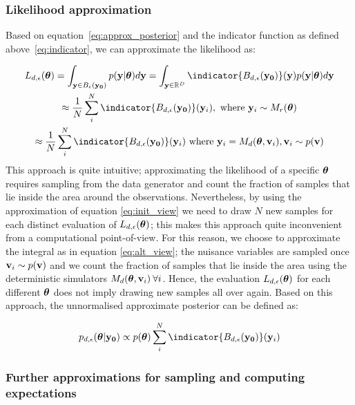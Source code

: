 \subsubsection*{Likelihood approximation}

Based on equation~\eqref{eq:approx_posterior} and the indicator
function as defined above~\eqref{eq:indicator}, we can approximate
the likelihood as:

\begin{gather} \label{eq:approx_likelihood}
  L_{d, \epsilon}(\thetab) =
  \int_{\yb \in B_\epsilon(\data)}p(\yb|\thetab)d\yb =
  \int_{\yb \in \R^D} \indicator{\region(\data)}(\yb)p(\yb|\thetab)d\yb\\
  \approx \frac{1}{N} \sum_i^N \indicator{\region(\data)}(\yb_i),\text{ where }
  \yb_i \sim M_r(\thetab) \label{eq:init_view}\\
  \approx \frac{1}{N} \sum_i^N \indicator{\region (\data)} (\yb_i)
  \text{ where } \yb_i = M_d(\thetab, \vb_i), \vb_i \sim p(\vb) \label{eq:alt_view}
\end{gather}
%
This approach is quite intuitive; approximating the likelihood of a
specific $\boldsymbol{\theta}$ requires sampling from the data generator and count
the fraction of samples that lie inside the area around the
observations. Nevertheless, by using the approximation of equation
\eqref{eq:init_view} we need to draw $N$ new samples for each distinct
evaluation of $L_{d,\epsilon}(\boldsymbol{\theta})$; this makes this approach
quite inconvenient from a computational point-of-view. For this reason, we choose to approximate the integral as in equation
\eqref{eq:alt_view}; the nuisance variables are sampled once
$\mathbf{v}_i \sim p(\mathbf{v})$ and we count the fraction of samples that lie
inside the area using the deterministic simulators
$M_d(\boldsymbol{\theta}, \mathbf{v}_i) \: \forall i$. Hence, the evaluation $L_{d,\epsilon}(\boldsymbol{\theta})$ for each different $\boldsymbol{\theta}$ does not imply drawing new samples all over again. Based on this approach, the
unnormalised approximate posterior can be defined as:

\begin{equation} \label{eq:aprox_posterior}
  p_{d,\epsilon}(\thetab|\data)
  \propto p(\thetab) \sum_i^N \indicator{ \region(\data)} (\yb_i)
\end{equation}

\subsubsection*{Further approximations for sampling and computing expectations}

